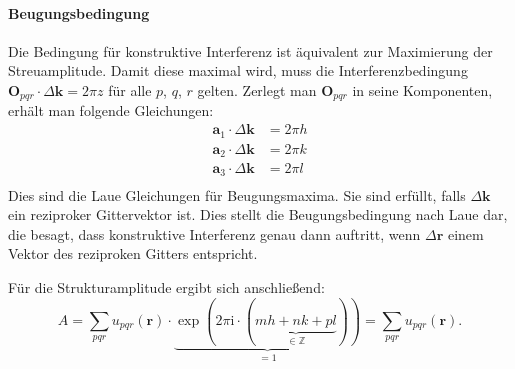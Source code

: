\paragraph{Beugungsbedingung}
Die Bedingung für konstruktive Interferenz ist äquivalent zur Maximierung der Streuamplitude.
Damit diese maximal wird, muss die Interferenzbedingung $\mathbf{O}_{pqr}\cdot\Delta \mathbf{k} =2\pi z$
für alle $p$, $q$, $r$ gelten.
Zerlegt man $\mathbf{O}_{pqr}$ in seine Komponenten, erhält man folgende Gleichungen:
\begin{align}
    \mathbf{a}_{1}\cdot\Delta \mathbf{k} &= 2\pi h \\
    \mathbf{a}_{2}\cdot\Delta \mathbf{k} &= 2\pi k \\
    \mathbf{a}_{3}\cdot\Delta \mathbf{k} &= 2\pi l \\
\end{align}
Dies sind die Laue Gleichungen für Beugungsmaxima.
Sie sind erfüllt, falls $\Delta \mathbf{k}$ ein reziproker Gittervektor ist.
Dies stellt die Beugungsbedingung nach Laue dar, die besagt, dass konstruktive Interferenz genau dann auftritt,
wenn $\Delta \mathbf{r}$ einem Vektor des reziproken Gitters entspricht.\autocite[125]{Ashcroft}

Für die Strukturamplitude ergibt sich anschließend:
\begin{equation}
    A = \sum_{pqr} u_{pqr}(\mathbf{r}) \cdot\underbrace{ \exp(2\pi \mathrm{i}
    \cdot(\underbrace{ mh+nk+pl }_{ \in\mathbb{Z} })) }_{ =1 }
    = \sum_{pqr} u_{pqr}(\mathbf{r}).
    \label{eq:strukturamplitude}
\end{equation}


